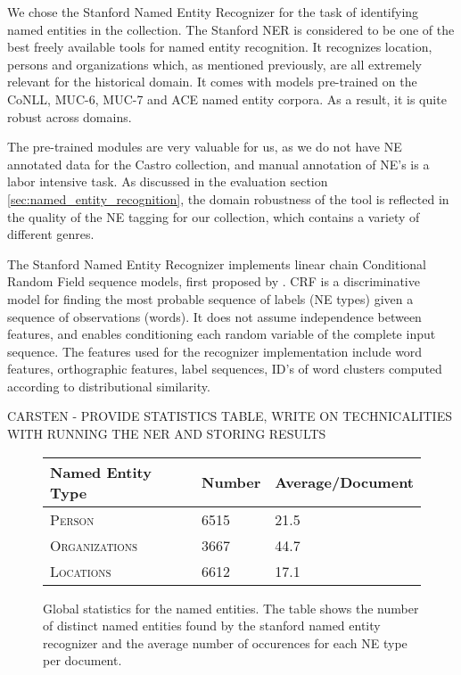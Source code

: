 
We chose the Stanford Named Entity Recognizer for the task of identifying named entities in the collection.
The Stanford NER is considered to be one of the best freely available tools for named entity recognition.
It recognizes location, persons and organizations which, as mentioned previously, are all extremely relevant for the historical domain. 
It comes with models pre-trained on the CoNLL, MUC-6, MUC-7 and ACE named entity corpora. As a result, it is quite robust across domains.

The pre-trained modules are very valuable for us, as we do not have NE annotated data for the Castro collection, and manual annotation of NE's is a labor intensive task. As discussed in the evaluation section \ref{sec:named_entity_recognition}, the domain robustness of the tool is reflected in the quality of the NE tagging for our collection, which contains a variety of different genres. 

The Stanford Named Entity Recognizer implements linear chain Conditional Random Field sequence models, first proposed by \cite{lafferty2001conditional}.
CRF is a discriminative model for finding the most probable sequence of labels (NE types) given a sequence of observations (words). 
It does not assume independence between features, and enables conditioning each random variable of the complete input sequence. The features used for the recognizer implementation include word features, orthographic features, label sequences, ID's of word clusters computed according to distributional similarity. 

CARSTEN - PROVIDE STATISTICS TABLE, WRITE ON TECHNICALITIES WITH RUNNING THE NER AND STORING RESULTS
\begin{figure}[ht]
\centering
\caption{Global statistics for the named entities. The table shows the number of distinct named
entities found by the stanford named entity recognizer and the average number of occurences for
each NE type per document.}
\begin{tabular}{l|ll}
  Named Entity Type      & Number & Average/Document\\
  \hline
  \textsc{Person}        & 6515   & 21.5\\
  \textsc{Organizations} & 3667   & 44.7\\
  \textsc{Locations}     & 6612   & 17.1\\
\end{tabular}
\label{fig:ne_statistics}
\end{figure}

